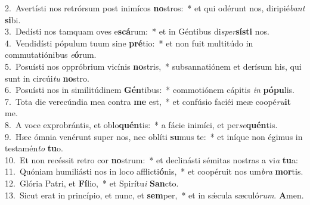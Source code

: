 {2.~}Avertísti nos retrórsum post inimícos \textbf{no}stros:~* et qui odérunt nos, diripié\textit{bant} \textbf{si}bi.\\
{3.~}Dedísti nos tamquam oves e\textbf{scá}rum:~* et in Géntibus di\textit{sper}\textbf{sí}\textbf{sti} nos.\\
{4.~}Vendidísti pópulum tuum sine \textbf{pré}tio:~* et non fuit multitúdo in commutatiónibus \textit{e}\textbf{ó}rum.\\
{5.~}Posuísti nos oppróbrium vicínis \textbf{no}stris,~* subsannatiónem et derísum his, qui sunt in circúi\textit{tu} \textbf{no}stro.\\
{6.~}Posuísti nos in similitúdinem \textbf{Gén}tibus:~* commotiónem cápitis \textit{in} \textbf{pó}\textbf{pu}lis.\\
{7.~}Tota die verecúndia mea contra \textbf{me} est,~* et confúsio faciéi meæ coopé\textit{ru}\textbf{it} me.\\
{8.~}A voce exprobrántis, et oblo\textbf{quén}tis:~* a fácie inimíci, et per\textit{se}\textbf{quén}tis.\\
{9.~}Hæc ómnia venérunt super nos, nec oblíti \textbf{su}mus te:~* et iníque non égimus in testamén\textit{to} \textbf{tu}o.\\
{10.~}Et non recéssit retro cor \textbf{no}strum:~* et declinásti sémitas nostras a vi\textit{a} \textbf{tu}a:\\
{11.~}Quóniam humiliásti nos in loco afflicti\textbf{ó}nis,~* et coopéruit nos um\textit{bra} \textbf{mor}tis.\\
{12.~}Glória Patri, et \textbf{Fí}lio,~* et Spirítu\textit{i} \textbf{San}cto.\\
{13.~}Sicut erat in princípio, et nunc, et \textbf{sem}per,~* et in sǽcula sæculó\textit{rum}. \textbf{A}men.\\

